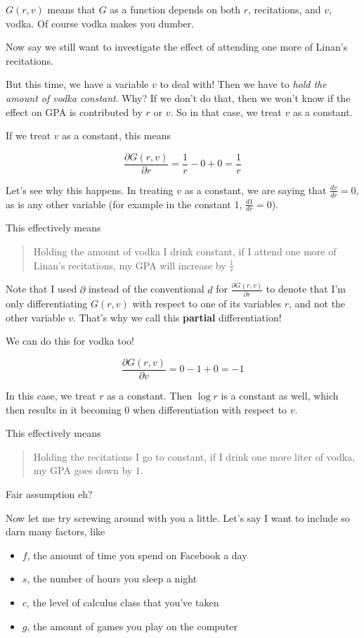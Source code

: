 \documentclass[11pt]{scrartcl}
\begin{document}
$G(r,v)$ means that $G$ as a function depends on both $r$, recitations, and $v$, vodka. Of course vodka makes you dumber. 

Now say we still want to investigate the effect of attending one more of Linan's recitations. 

But this time, we have a variable $v$ to deal with! Then we have to \emph{hold the amount of vodka constant}. Why? If we don't do that, then we won't know if the effect on GPA is contributed by $r$ or $v$. So in that case, we treat $v$ as a constant.

If we treat $v$ as a constant, this means

\[\frac{\partial G(r,v)}{\partial r} = \frac{1}{r} - 0 + 0 = \frac{1}{r}\]

Let's see why this happens. In treating $v$ as a constant, we are saying that $\frac{d v}{d r} = 0$, as is any other variable (for example in the constant 1, $\frac{d 1}{d r} = 0$).

This effectively means 

\begin{quote}
Holding the amount of vodka I drink constant, if I attend one more of Linan's recitations, my GPA will increase by $\frac{1}{r}$
\end{quote}

Note that I used $\partial$ instead of the conventional $d$ for $\frac{\partial G(r,v)}{\partial r}$ to denote that I'm only differentiating $G(r,v)$ with respect to one of its variables $r$, and not the other variable $v$. That's why we call this \textbf{partial} differentiation!

We can do this for vodka too!

\[\frac{\partial G(r,v)}{\partial v} = 0 - 1 + 0 = -1 \]

In this case, we treat $r$ as a constant. Then $\log{r}$ is a constant as well, which then results in it becoming $0$ when differentiation with respect to $v$. 

This effectively means

\begin{quote}
Holding the recitations I go to constant, if I drink one more liter of vodka, my GPA goes down by $1$.
\end{quote}

Fair assumption eh?

Now let me try screwing around with you a little. Let's say I want to include so darn many factors, like 

\begin{itemize}
	\item $f$, the amount of time you spend on Facebook a day
	\item $s$, the number of hours you sleep a night
	\item $c$, the level of calculus class that you've taken
	\item $g$, the amount of games you play on the computer
\end{itemize}
\end{document}
